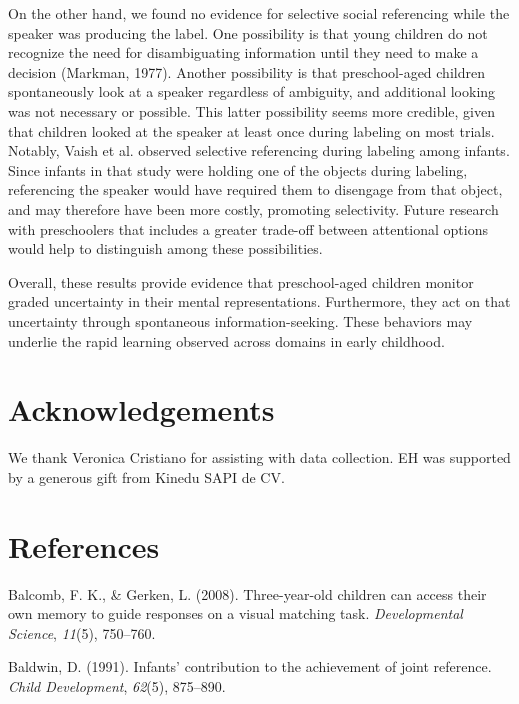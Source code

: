 \documentclass[english,man]{apa6}
\theoremstyle{definition}
\theoremstyle{definition}
\theoremstyle{definition}
\theoremstyle{remark}
\begin{document}
On the other hand, we found no evidence for selective social referencing
while the speaker was producing the label. One possibility is that young
children do not recognize the need for disambiguating information until
they need to make a decision (Markman, 1977). Another possibility is
that preschool-aged children spontaneously look at a speaker regardless
of ambiguity, and additional looking was not necessary or possible. This
latter possibility seems more credible, given that children looked at
the speaker at least once during labeling on most trials. Notably, Vaish
et al. observed selective referencing during labeling among infants.
Since infants in that study were holding one of the objects during
labeling, referencing the speaker would have required them to disengage
from that object, and may therefore have been more costly, promoting
selectivity. Future research with preschoolers that includes a greater
trade-off between attentional options would help to distinguish among
these possibilities.

Overall, these results provide evidence that preschool-aged children
monitor graded uncertainty in their mental representations. Furthermore,
they act on that uncertainty through spontaneous information-seeking.
These behaviors may underlie the rapid learning observed across domains
in early childhood.

\section{Acknowledgements}\label{acknowledgements}

We thank Veronica Cristiano for assisting with data collection. EH was
supported by a generous gift from Kinedu SAPI de CV.

\section{References}\label{references}

\setlength{\parindent}{-0.1in} \setlength{\leftskip}{0.125in} \noindent

\hypertarget{refs}{}
\hypertarget{ref-Balcomb2008}{}
Balcomb, F. K., \& Gerken, L. (2008). Three-year-old children can access
their own memory to guide responses on a visual matching task.
\emph{Developmental Science}, \emph{11}(5), 750--760.

\hypertarget{ref-Baldwin1991}{}
Baldwin, D. (1991). Infants' contribution to the achievement of joint
reference. \emph{Child Development}, \emph{62}(5), 875--890.
\end{document}
